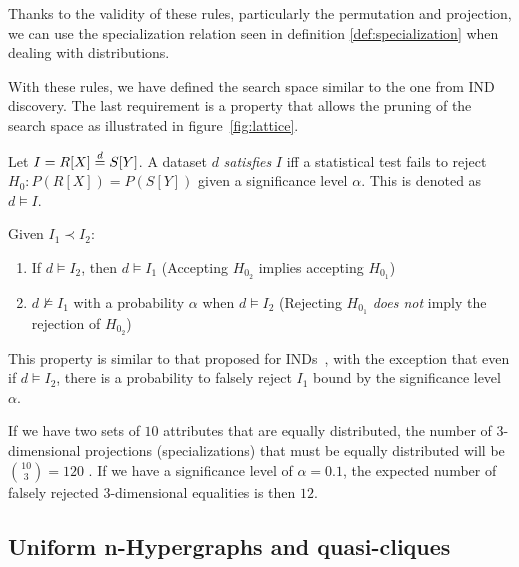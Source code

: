 Thanks to the validity of these rules, particularly the permutation and projection,
we can use the specialization relation seen in definition \ref{def:specialization}
when dealing with distributions.

With these rules, we have defined the search space similar to the one from \gls{IND} discovery.
The last requirement is a property that allows the pruning of the
search space as illustrated in figure~\ref{fig:lattice}.

Let $I = R[X] \stackrel{d}{=} S[Y]$.
A dataset $d$ \emph{satisfies} $I$ iff  a statistical test fails to reject $H_0: P(R[X]) = P(S[Y])$
given a significance level $\alpha$.
This is denoted as $d \models I$.

\begin{property}
    Given $I_1 \prec I_2$:
    
    \label{prop:prob_spec}
    \begin{enumerate}
        \item If $d \models I_2$, then $d \models I_1$ (Accepting $H_{0_2}$ implies accepting $H_{0_1}$\footnotemark)
        \item $d \not\models I_1$ with a probability $\alpha$ when $d \models I_2$
            (Rejecting $H_{0_1}$ \emph{does not} imply the rejection of $H_{0_2}$)
    \end{enumerate}
\end{property}


This property is similar to that proposed for \glspl{IND}~\cite{DeMarchi2002}, with the exception that even if $d \models I_2$, there is a probability to falsely reject $I_1$ bound by the significance level $\alpha$.

\begin{example}
    If we have two sets of $10$ attributes that are equally distributed, the number of
    3-dimensional projections (specializations) that must be equally distributed will be $\binom{10}{3} = 120$ .
    If we have a significance level of $\alpha = 0.1$, the expected number of
    falsely rejected 3-dimensional equalities is then $12$.
\end{example}

\subsection{Uniform n-Hypergraphs and quasi-cliques}

